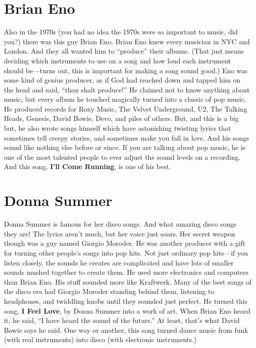 \documentclass[letterpaper,single]{article}
\begin{document}
\section{Brian Eno}
Also in the 1970s (you had no idea the 1970s were so important to music, did you?) there was this guy Brian Eno. 
Brian Eno knew every musician in NYC and London. 
And they all wanted him to ``produce'' their albums. 
(That just means deciding which instruments to use on a song and how loud each instrument should be---turns out, this is important for making a song sound good.) 
Eno was some kind of genius producer, as if God had reached down and tapped him on the head and said, ``thou shalt produce!''
He claimed not to know anything about music, but every album he touched magically turned into a classic of pop music. 
He produced records for Roxy Music, The Velvet Underground, U2, The Talking Heads, Genesis, David Bowie, Devo, and piles of others. 
But, and this is a big but, he also wrote songs himself which have astonishing twisting lyrics that sometimes tell creepy stories, and sometimes make you fall in love. 
And his songs sound like nothing else before or since. 
If you are talking about pop music, he is one of the most talented people to ever adjust the sound levels on a recording.
And this song, \textbf{I'll Come Running}, is one of his best.

\section{Donna Summer}
Donna Summer is famous for her disco songs. 
And what amazing disco songs they are! 
The lyrics aren't much, but her voice just soars. 
Her secret weapon though was a guy named Giorgio Moroder. 
He was another producer with a gift for turning other people's songs into pop hits. 
Not just ordinary pop hits---if you listen closely, the sounds he creates are complicated and have lots of smaller sounds mushed together to create them.
He used more electronics and computers than Brian Eno. 
His stuff sounded more like Kraftwerk. 
Many of the best songs of the disco era had Giorgio Moroder standing behind them, listening to headphones, and twiddling knobs until they sounded just perfect.
He turned this song, \textbf{I Feel Love}, by Donna Summer into a work of art. 
When Brian Eno heard it, he said, ``I have heard the sound of the future.'' 
At least, that's what David Bowie says he said. 
One way or another, this song turned dance music from funk (with real instruments) into disco (with electronic instruments.)
\end{document}
